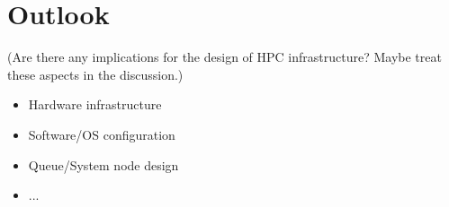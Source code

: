 \section{Outlook}

(Are there any implications for the design of HPC infrastructure? Maybe treat these aspects in the discussion.)

\begin{itemize}
  \item Hardware infrastructure
  \item Software/OS configuration
  \item Queue/System node design
  \item ...
\end{itemize}
